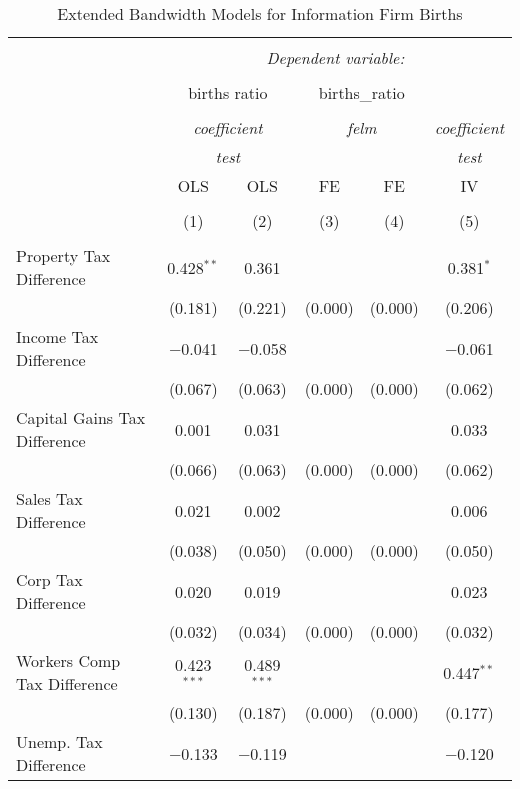 
\begin{table}[!htbp] \centering 
  \caption{Extended Bandwidth Models for  Information Firm Births} 
  \label{} 
\begin{tabular}{@{\extracolsep{5pt}}lccccc} 
\\[-1.8ex]\hline 
\hline \\[-1.8ex] 
 & \multicolumn{5}{c}{\textit{Dependent variable:}} \\ 
\cline{2-6} 
\\[-1.8ex] & \multicolumn{2}{c}{births ratio} & \multicolumn{2}{c}{births\_ratio} &   \\ 
\\[-1.8ex] & \multicolumn{2}{c}{\textit{coefficient}} & \multicolumn{2}{c}{\textit{felm}} & \textit{coefficient} \\ 
 & \multicolumn{2}{c}{\textit{test}} & \multicolumn{2}{c}{\textit{}} & \textit{test} \\ 
 & OLS & OLS & FE & FE & IV \\ 
\\[-1.8ex] & (1) & (2) & (3) & (4) & (5)\\ 
\hline \\[-1.8ex] 
 Property Tax Difference & 0.428$^{**}$ & 0.361 &  &  & 0.381$^{*}$ \\ 
  & (0.181) & (0.221) & (0.000) & (0.000) & (0.206) \\ 
  Income Tax Difference & $-$0.041 & $-$0.058 &  &  & $-$0.061 \\ 
  & (0.067) & (0.063) & (0.000) & (0.000) & (0.062) \\ 
  Capital Gains Tax Difference & 0.001 & 0.031 &  &  & 0.033 \\ 
  & (0.066) & (0.063) & (0.000) & (0.000) & (0.062) \\ 
  Sales Tax Difference & 0.021 & 0.002 &  &  & 0.006 \\ 
  & (0.038) & (0.050) & (0.000) & (0.000) & (0.050) \\ 
  Corp Tax Difference & 0.020 & 0.019 &  &  & 0.023 \\ 
  & (0.032) & (0.034) & (0.000) & (0.000) & (0.032) \\ 
  Workers Comp Tax Difference & 0.423$^{***}$ & 0.489$^{***}$ &  &  & 0.447$^{**}$ \\ 
  & (0.130) & (0.187) & (0.000) & (0.000) & (0.177) \\ 
  Unemp. Tax Difference & $-$0.133 & $-$0.119 &  &  & $-$0.120 \\ 

\end{tabular}
\end{table}
